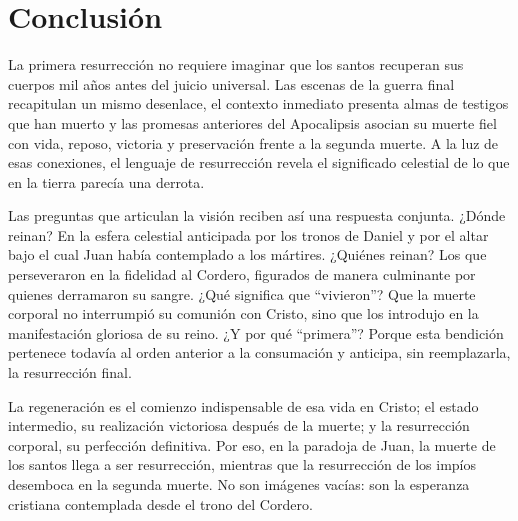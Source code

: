 \section*{Conclusión}
La primera resurrección no requiere imaginar que los santos recuperan sus cuerpos mil años antes del juicio universal.
Las escenas de la guerra final recapitulan un mismo desenlace, el contexto inmediato presenta almas de testigos que han muerto y las promesas anteriores del Apocalipsis asocian su muerte fiel con vida, reposo, victoria y preservación frente a la segunda muerte.
A la luz de esas conexiones, el lenguaje de resurrección revela el significado celestial de lo que en la tierra parecía una derrota.

Las preguntas que articulan la visión reciben así una respuesta conjunta.
¿Dónde reinan? En la esfera celestial anticipada por los tronos de Daniel y por el altar bajo el cual Juan había contemplado a los mártires.
¿Quiénes reinan? Los que perseveraron en la fidelidad al Cordero, figurados de manera culminante por quienes derramaron su sangre.
¿Qué significa que \enquote{vivieron}? Que la muerte corporal no interrumpió su comunión con Cristo, sino que los introdujo en la manifestación gloriosa de su reino.
¿Y por qué \enquote{primera}? Porque esta bendición pertenece todavía al orden anterior a la consumación y anticipa, sin reemplazarla, la resurrección final.

La regeneración es el comienzo indispensable de esa vida en Cristo; el estado intermedio, su realización victoriosa después de la muerte; y la resurrección corporal, su perfección definitiva.
Por eso, en la paradoja de Juan, la muerte de los santos llega a ser resurrección, mientras que la resurrección de los impíos desemboca en la segunda muerte.
No son imágenes vacías: son la esperanza cristiana contemplada desde el trono del Cordero.

